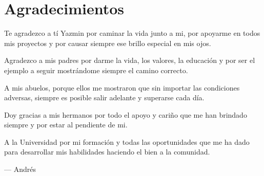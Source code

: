 \cleardoublepage  
\chapter*{Agradecimientos}
\label{chap:ack}

	Te agradezco a t\'{i} Yazmin por caminar la vida junto a mi, por apoyarme en todos mis proyectos y por causar siempre ese brillo especial en mis ojos.

\vspace{2.5em}

	Agradezco a mis padres por darme la vida, los valores, la educaci\'{o}n y por ser el ejemplo a seguir mostr\'{a}ndome siempre el camino correcto.

\vspace{2.5em}

	A mis abuelos, porque ellos me mostraron que sin importar las condiciones adversas, siempre es posible salir adelante y superarse cada d\'{i}a.

\vspace{2.5em}

	Doy gracias a mis hermanos por todo el apoyo y cari\~{n}o que me han brindado siempre y por estar al pendiente de mi.

\vspace{2.5em}

	A la Universidad por mi formaci\'{o}n y todas las oportunidades que me ha dado para desarrollar mis habilidades haciendo el bien a la comunidad.

\vspace{5em}


\vspace{1em}


\vspace{5em}

\hfill --- Andr\'{e}s 

